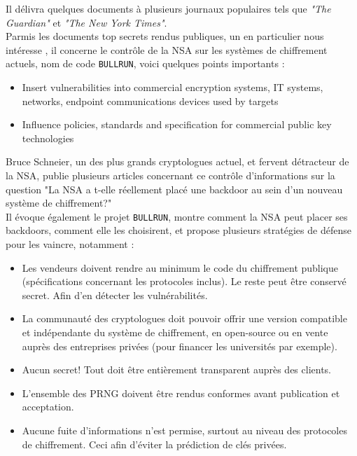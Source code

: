 	Il délivra quelques documents à plusieurs journaux populaires
	tels que \textit{"The Guardian"} et \textit{"The New York Times"}.\\
	
	Parmis les documents top secrets rendus publiques, un en particulier
	nous intéresse \cite{topsecretNSA}, il concerne le contrôle de la NSA 
	sur les systèmes de chiffrement actuels, nom de code \texttt{BULLRUN},
	voici quelques points importants :\\
	\begin{itemize}
		\item Insert vulnerabilities into commercial encryption systems, IT 
		systems, networks, endpoint communications devices used by targets
		\item Influence policies, standards and specification for commercial 
		public key technologies\\
	\end{itemize}
	
	Bruce Schneier, un des plus grands cryptologues actuel,
	et fervent détracteur de la NSA, publie plusieurs articles concernant
	ce contrôle d'informations sur la question "La NSA a t-elle 
	réellement placé une backdoor au sein d'un nouveau système de 
	chiffrement?" \cite{schneier2007NSA} \\

	Il évoque également le projet \texttt{BULLRUN}, montre comment la NSA
	peut placer ses backdoors, comment elle les choisirent, 
	et propose plusieurs stratégies de défense \cite{schneier2013NSA}
	pour les vaincre, notamment : \\
	\begin{itemize}
	\item Les vendeurs doivent rendre au minimum le code du chiffrement
	publique (spécifications concernant les protocoles inclus). Le reste
	peut être conservé secret. Afin d'en détecter les vulnérabilités.
	\item La communauté des cryptologues doit pouvoir offrir une version
	compatible et indépendante du système de chiffrement, en open-source
	ou en vente auprès des entreprises privées (pour financer les
	universités par exemple).
	\item Aucun secret! Tout doit être entièrement transparent auprès des
	clients.
	\item L'ensemble des PRNG doivent être rendus conformes avant 
	publication et acceptation.
	\item Aucune fuite d'informations n'est permise, surtout au niveau
	des protocoles de chiffrement. Ceci afin d'éviter la prédiction de
	clés privées.\\
	\end{itemize}
	
